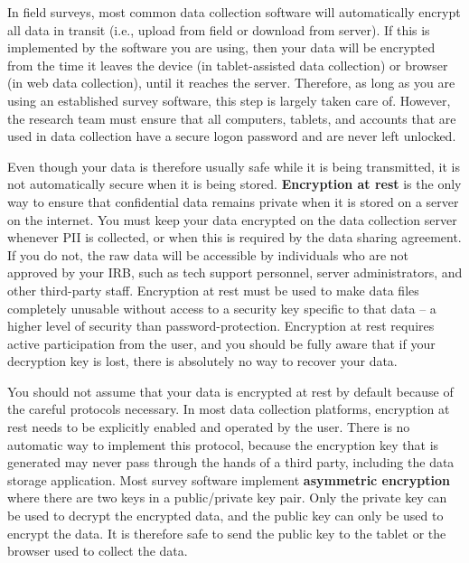 In field surveys, most common data collection software will automatically encrypt
all data in transit (i.e., upload from field or download from server).
If this is implemented by the software you are using,
then your data will be encrypted from the time it leaves the device
(in tablet-assisted data collection) or browser (in web data collection),
until it reaches the server.
Therefore, as long as you are using an established survey software,
this step is largely taken care of.
However, the research team must ensure that all computers, tablets,
and accounts that are used in data collection have a secure logon
password and are never left unlocked.

Even though your data is therefore usually safe while it is being transmitted,
it is not automatically secure when it is being stored.
\textbf{Encryption at rest}
is the only way to ensure that confidential data remains private when it is stored on a
server on the internet.
You must keep your data encrypted on the data collection server whenever PII is collected,
or when this is required by the data sharing agreement.
If you do not, the raw data will be accessible by
individuals who are not approved by your IRB,
such as tech support personnel,
server administrators, and other third-party staff.
Encryption at rest must be used to make
data files completely unusable without access to a security key specific to that
data -- a higher level of security than password-protection.
Encryption at rest requires active participation from the user,
and you should be fully aware that if your decryption key is lost,
there is absolutely no way to recover your data.

You should not assume that your data is encrypted at rest by default because of
the careful protocols necessary.
In most data collection platforms,
encryption at rest needs to be explicitly enabled and operated by the user.
There is no automatic way to implement this protocol,
because the encryption key that is generated may
never pass through the hands of a third party,
including the data storage application.
Most survey software implement \textbf{asymmetric encryption}
where there are two keys in a public/private key pair.
Only the private key can be used to decrypt the encrypted data,
and the public key can only be used to encrypt the data.
It is therefore safe to send the public key
to the tablet or the browser used to collect the data.

